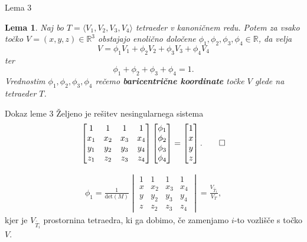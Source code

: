 \documentclass{beamer}
\newtheorem{lemma1}{Lema}
\begin{document}
\begin{frame}{Lema 3}
\begin{lemma1}\label{lema_baricentricne}
    Naj bo $T = \langle V_1, V_2, V_3, V_4 \rangle$ tetraeder v kanoničnem redu.
    Potem za vsako točko $V = (x,y,z) \in \mathbb{R}^3$ obstajajo enolično določene
     $\phi_1, \phi_2, \phi_3, \phi_4 \in \mathbb{R}$,
    da velja 
    \begin{equation}\label{eq_baricentricne}
        V = \phi_1 V_1 + \phi_2 V_2 + \phi_3 V_3 + \phi_4 V_4
    \end{equation} ter 
    \begin{equation}\label{eq_particija}
        \phi_1 + \phi_2 + \phi_3 + \phi_4 = 1 .
    \end{equation}
    Vrednostim $\phi_1, \phi_2, \phi_3, \phi_4$ rečemo \textbf{baricentrične 
    koordinate} točke $V$ glede na tetraeder $T$.
\end{lemma1}
\end{frame}

\begin{frame}{Dokaz leme 3}
    Željeno je rešitev nesingularnega sistema
    \begin{align*}
        \begin{bmatrix}
            1 & 1 & 1 & 1 \\
            x_1 & x_2 & x_3 & x_4 \\
            y_1 & y_2 & y_3 & y_4 \\
            z_1 & z_2 & z_3 & z_4
        \end{bmatrix} 
        \begin{bmatrix}\phi_1 \\ \phi_2 \\ \phi_3 \\ \phi_4 \end{bmatrix} = \begin{bmatrix}
            1 \\ x \\ y \\ z \end{bmatrix}.
        \qed
    \end{align*}

    \begin{align*}\label{eq_cramer}
        \phi_1 = \frac{1}{\text{det}(M)}
        \begin{vmatrix}
            1 & 1 & 1 & 1 \\
            x & x_2 & x_3 & x_4 \\
            y & y_2 & y_3 & y_4 \\
            z & z_2 & z_3 & z_4
        \end{vmatrix}
        = \frac{V_{\widetilde{T_1}}}{V_T},
    \end{align*}
    kjer je $V_{\widetilde{T_i}}$
    prostornina tetraedra, ki ga dobimo, če zamenjamo $i$-to vozlišče
    s točko $V$.
\end{frame}
\end{document}
